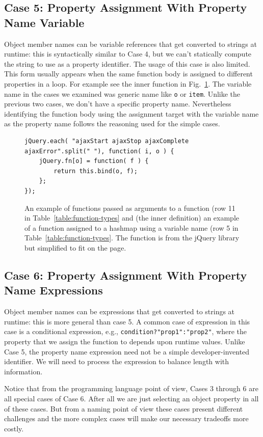 \documentclass[10pt, preprint]{sigplanconf}
\begin{document}
{\subsection{Case 5: Property Assignment With  Property Name Variable}
Object member names can be variable references that get converted to strings at runtime: this is syntactically similar to Case 4, but we can't statically compute the string to use as a property identifier.
The usage of this case is also limited. This form usually appears when the same function body is assigned to different properties in a loop. 
For example see the inner function in Fig.~\ref{fig:jQueryEach}. The variable
 name in the cases we examined was generic name like {\small\texttt{o}} or {\small\texttt{item}}. Unlike the previous two cases, we
don't have a specific property name.  Nevertheless identifying the function body using the assignment target with the variable name as the property name follows the reasoning used for the simple cases.
\begin{figure}[htp]
\begin{verbatim}
jQuery.each( "ajaxStart ajaxStop ajaxComplete ajaxError".split(" "), function( i, o ) {
    jQuery.fn[o] = function( f ) {
        return this.bind(o, f);
    };
});
\end{verbatim}
\caption{An example of functions passed as arguments to a function (row 11 in Table~\ref{table:function-types} and (the inner definition) an example of a 
function assigned to a hashmap using a variable name (row 5 in Table~\ref{table:function-types}. The function is from the jQuery library but simplified to fit on the page. }
\label{fig:jQueryEach}
\end{figure}

\subsection{Case 6:  Property Assignment With  Property Name Expressions}
Object member names can be expressions that get converted to strings at runtime: this is more general than case 5. 
 A common case of expression in this case is a conditional expression, e.g., {\small\texttt{condition?"prop1":"prop2"}}, where the property that we assign the function to depends upon runtime values. Unlike Case 5, the property name expression need not be a simple developer-invented identifier. We will need to process the expression to balance length with information.

Notice that from the programming language point of view, Cases 3 through 6 are all special cases of Case 6. After all we are just selecting an object property in all of these cases.  But from a naming point of view these cases present different challenges and the more complex cases will make our necessary tradeoffs more costly.

}
\end{document}
